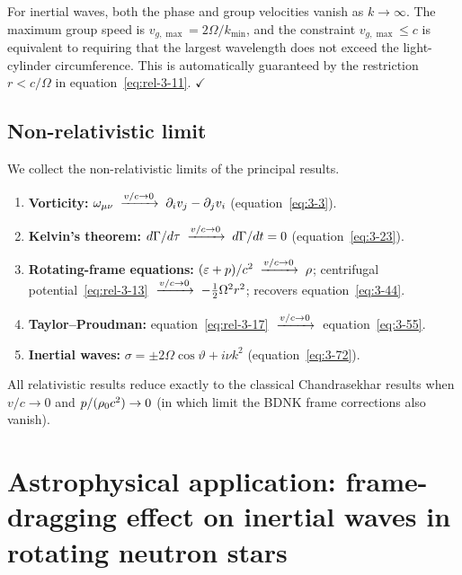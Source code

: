 \begin{causalitycheck}
For inertial waves, both the phase and group velocities vanish as
$k\to\infty$.  The maximum group speed is
$v_{g,\max} = 2\Omega/k_{\min}$, and the constraint
$v_{g,\max} \leq c$ is equivalent to requiring that the largest
wavelength does not exceed the light-cylinder circumference.
This is automatically guaranteed by the restriction
$r < c/\Omega$ in equation~\eqref{eq:rel-3-11}. $\checkmark$
\end{causalitycheck}

\subsection{Non-relativistic limit}

We collect the non-relativistic limits of the principal results.

\begin{enumerate}
  \item \textbf{Vorticity:}
    $\omega_{\mu\nu} \;\xrightarrow{v/c \to 0}\;
    \partial_{i}v_{j} - \partial_{j}v_{i}$
    \quad(equation~\eqref{eq:3-3}).

  \item \textbf{Kelvin's theorem:}
    $d\Gamma/d\tau \;\xrightarrow{v/c \to 0}\; d\Gamma/dt = 0$
    \quad(equation~\eqref{eq:3-23}).

  \item \textbf{Rotating-frame equations:}
    $(\varepsilon+p)/c^{2} \;\xrightarrow{v/c \to 0}\; \rho$;
    centrifugal potential~\eqref{eq:rel-3-13}
    $\;\xrightarrow{v/c \to 0}\; -\frac{1}{2}\Omega^{2}r^{2}$;
    recovers equation~\eqref{eq:3-44}.

  \item \textbf{Taylor--Proudman:}
    equation~\eqref{eq:rel-3-17}
    $\;\xrightarrow{v/c \to 0}\;$ equation~\eqref{eq:3-55}.

  \item \textbf{Inertial waves:}
    $\sigma = \pm 2\Omega\cos\vartheta + i\nu k^{2}$
    \quad(equation~\eqref{eq:3-72}).
\end{enumerate}

\noindent All relativistic results reduce exactly to the classical
Chandrasekhar results when $v/c\to 0$ and $p/(\rho_0 c^{2})\to 0$
(in which limit the BDNK frame corrections also vanish).


\section{Astrophysical application: frame-dragging effect on inertial
waves in rotating neutron stars}\label{sec:rel-3-app-19-23}

